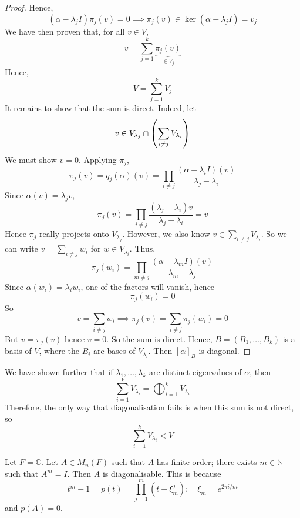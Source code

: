 \begin{proof}
	Hence,
	\[
		(\alpha - \lambda_j I) \pi_j(v) = 0 \implies \pi_j(v) \in \ker(\alpha - \lambda_j I) = v_j
	\]
	We have then proven that, for all \( v \in V \),
	\[
		v = \sum_{j=1}^k \underbrace{\pi_j(v)}_{\in V_j}
	\]
	Hence,
	\[
		V = \sum_{j=1}^k V_j
	\]
	It remains to show that the sum is direct.
	Indeed, let
	\[
		v \in V_{\lambda_j} \cap \qty(\sum_{i \neq j} V_{\lambda_i})
	\]
	We must show \( v = 0 \).
	Applying \( \pi_j \),
	\[
		\pi_j(v) = q_j(\alpha)(v) = \prod_{i \neq j} \frac{(\alpha - \lambda_i I)(v)}{\lambda_j - \lambda_i}
	\]
	Since \( \alpha(v) = \lambda_j v \),
	\[
		\pi_j(v) = \prod_{i \neq j} \frac{(\lambda_j - \lambda_i)v}{\lambda_j - \lambda_i} = v
	\]
	Hence \( \pi_j \) really projects onto \( V_{\lambda_j} \).
	However, we also know \( v \in \sum_{i \neq j} V_{\lambda_i} \).
	So we can write \( v = \sum_{i \neq j} w_i \) for \( w \in V_{\lambda_i} \).
	Thus,
	\[
		\pi_j(w_i) = \prod_{m \neq j} \frac{(\alpha - \lambda_m I)(v)}{\lambda_m - \lambda_j}
	\]
	Since \( \alpha(w_i) = \lambda_i w_i \), one of the factors will vanish, hence
	\[
		\pi_j(w_i) = 0
	\]
	So
	\[
		v = \sum_{i \neq j} w_i \implies \pi_j(v) = \sum_{i \neq j} \pi_j(w_i) = 0
	\]
	But \( v = \pi_j(v) \) hence \( v = 0 \).
	So the sum is direct.
	Hence, \( B = (B_1, \dots, B_k) \) is a basis of \( V \), where the \( B_i \) are bases of \( V_{\lambda_i} \).
	Then \( [\alpha]_B \) is diagonal.
\end{proof}
\begin{remark}
	We have shown further that if \( \lambda_1, \dots, \lambda_k \) are distinct eigenvalues of \( \alpha \), then
	\[
		\sum_{i=1}^k V_{\lambda_i} = \bigoplus_{i=1}^k V_{\lambda_i}
	\]
	Therefore, the only way that diagonalisation fails is when this sum is not direct, so
	\[
		\sum_{i=1}^k V_{\lambda_i} < V
	\]
\end{remark}
\begin{example}
	Let \( F = \mathbb C \).
	Let \( A \in M_n(F) \) such that \( A \) has finite order; there exists \( m \in \mathbb N \) such that \( A^m = I \).
	Then \( A \) is diagonalisable.
	This is because
	\[
		t^m - 1 = p(t) = \prod_{j=1}^m (t - \xi_m^j);\quad \xi_m = e^{2 \pi i/m}
	\]
	and \( p(A) = 0 \).
\end{example}

